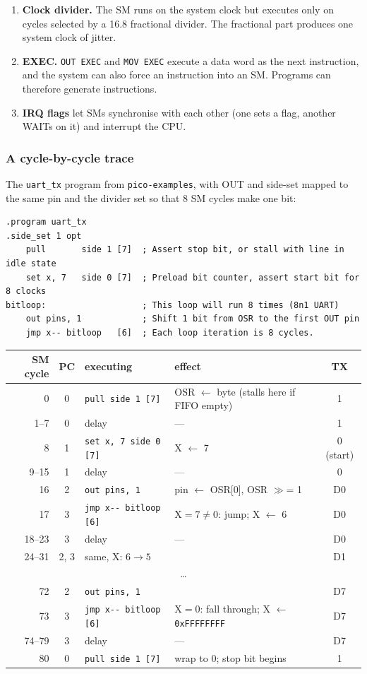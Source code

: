 \begin{enumerate}[label=\arabic*.]
    which costs two cycles of latency (\cref{sec:meta}).
  \item \textbf{Clock divider.} The SM runs on the system clock but executes
    only on cycles selected by a 16.8 fractional divider. The fractional
    part produces one system clock of jitter.
  \item \textbf{EXEC.} \texttt{OUT EXEC} and \texttt{MOV EXEC} execute a data
    word as the next instruction, and the system can also force an
    instruction into an SM. Programs can therefore generate instructions.
  \item \textbf{IRQ flags} let SMs synchronise with each other (one sets
    a flag, another WAITs on it) and interrupt the CPU.
\end{enumerate}

\subsubsection{A cycle-by-cycle trace}
The \texttt{uart\_tx} program from \texttt{pico-examples}, with OUT and
side-set mapped to the same pin and the divider set so that 8 SM cycles make
one bit:
\begin{verbatim}
.program uart_tx
.side_set 1 opt
    pull       side 1 [7]  ; Assert stop bit, or stall with line in idle state
    set x, 7   side 0 [7]  ; Preload bit counter, assert start bit for 8 clocks
bitloop:                   ; This loop will run 8 times (8n1 UART)
    out pins, 1            ; Shift 1 bit from OSR to the first OUT pin
    jmp x-- bitloop   [6]  ; Each loop iteration is 8 cycles.
\end{verbatim}
\begin{center}
\small
\begin{tabular}{|r|c|l|l|c|}
\hline
SM cycle & PC & executing & effect & TX \\ \hline
0 & 0 & \texttt{pull side 1 [7]} & OSR $\gets$ byte (stalls here if FIFO
  empty) & 1 \\
1--7 & 0 & delay & --- & 1 \\
8 & 1 & \texttt{set x, 7 side 0 [7]} & X $\gets$ 7 & 0 (start) \\
9--15 & 1 & delay & --- & 0 \\
16 & 2 & \texttt{out pins, 1} & pin $\gets$ OSR[0], OSR $\gg$= 1 & D0 \\
17 & 3 & \texttt{jmp x-{}- bitloop [6]} & X$=7\neq0$: jump; X $\gets$ 6 & D0 \\
18--23 & 3 & delay & --- & D0 \\
24--31 & 2, 3 & same, X: $6\to5$ & & D1 \\
\multicolumn{5}{|c|}{\ldots} \\
72 & 2 & \texttt{out pins, 1} & & D7 \\
73 & 3 & \texttt{jmp x-{}- bitloop [6]} & X$=0$: fall through;
  X $\gets$ \texttt{0xFFFFFFFF} & D7 \\
74--79 & 3 & delay & --- & D7 \\
80 & 0 & \texttt{pull side 1 [7]} & wrap to 0; stop bit begins & 1 \\ \hline
\end{tabular}
\end{center}
